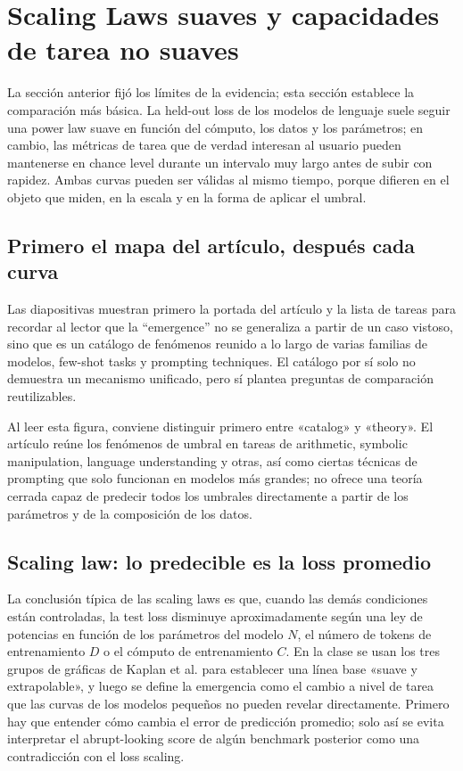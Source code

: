 \section{Scaling Laws suaves y capacidades de tarea no suaves}

La sección anterior fijó los límites de la evidencia; esta sección establece la comparación más básica. La held-out loss de los modelos de lenguaje suele seguir una power law suave en función del cómputo, los datos y los parámetros; en cambio, las métricas de tarea que de verdad interesan al usuario pueden mantenerse en chance level durante un intervalo muy largo antes de subir con rapidez. Ambas curvas pueden ser válidas al mismo tiempo, porque difieren en el objeto que miden, en la escala y en la forma de aplicar el umbral.

\subsection{Primero el mapa del artículo, después cada curva}

Las diapositivas muestran primero la portada del artículo y la lista de tareas para recordar al lector que la ``emergence'' no se generaliza a partir de un caso vistoso, sino que es un catálogo de fenómenos reunido a lo largo de varias familias de modelos, few-shot tasks y prompting techniques. El catálogo por sí solo no demuestra un mecanismo unificado, pero sí plantea preguntas de comparación reutilizables.


Al leer esta figura, conviene distinguir primero entre «catalog» y «theory». El artículo reúne los fenómenos de umbral en tareas de arithmetic, symbolic manipulation, language understanding y otras, así como ciertas técnicas de prompting que solo funcionan en modelos más grandes; no ofrece una teoría cerrada capaz de predecir todos los umbrales directamente a partir de los parámetros y de la composición de los datos.

\subsection{Scaling law: lo predecible es la loss promedio}

La conclusión típica de las scaling laws es que, cuando las demás condiciones están controladas, la test loss disminuye aproximadamente según una ley de potencias en función de los parámetros del modelo $N$, el número de tokens de entrenamiento $D$ o el cómputo de entrenamiento $C$. En la clase se usan los tres grupos de gráficas de Kaplan et al. para establecer una línea base «suave y extrapolable», y luego se define la emergencia como el cambio a nivel de tarea que las curvas de los modelos pequeños no pueden revelar directamente. Primero hay que entender cómo cambia el error de predicción promedio; solo así se evita interpretar el abrupt-looking score de algún benchmark posterior como una contradicción con el loss scaling.

